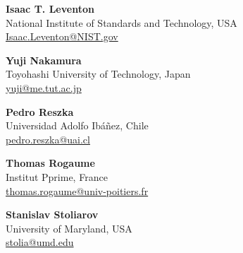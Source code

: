 \documentclass[12pt,demo]{article}
\begin{document}
\textbf{Isaac T. Leventon}\\
     National Institute of Standards and Technology, USA\\
         \href{mailto:isaac.leventon@NIST.gov }{Isaac.Leventon@NIST.gov }
   \vspace{0.5cm}

\textbf{Yuji Nakamura} \\
    Toyohashi University of Technology, Japan\\
    \href{mailto:yuji@me.tut.ac.jp}{yuji@me.tut.ac.jp}
   \vspace{0.5cm}

\textbf{Pedro Reszka} \\
    Universidad Adolfo Ibáñez, Chile\\
    \href{mailto:pedro.reszka@uai.cl}{pedro.reszka@uai.cl}
   \vspace{0.5cm}

\textbf{Thomas Rogaume} \\
Institut Pprime, France\\
    \href{mailto:thomas.rogaume@univ-poitiers.fr}{thomas.rogaume@univ-poitiers.fr}

    \vspace{0.5cm}   

\textbf{Stanislav Stoliarov} \\
University of Maryland, USA\\
    \href{mailto:stolia@umd.edu}{stolia@umd.edu}
    \vspace{0.4cm}
    




\end{document}
